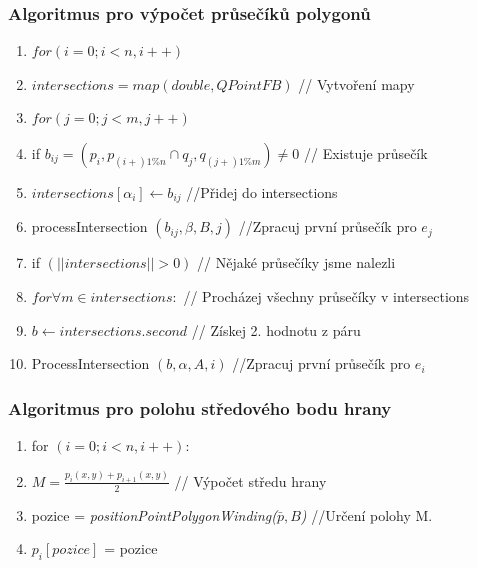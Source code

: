 \documentclass[a4paper, 12pt]{article}
\begin{document}
\newpage
\subsubsection{Algoritmus pro výpočet průsečíků polygonů}
\begin{enumerate}
\item $ for (i = 0; i < n, i++) $ 
\item \hspace {1cm} $ intersections = map (double, QPointFB) $ // Vytvoření mapy 
\item \hspace {1cm} $ for (j = 0; j < m, j++) $
\item \hspace {2cm} if $ b_{ij} = (p_i, p_{(i+)1\%n} \cap q_j, q_{(j+)1\%m }) \neq 0$ // Existuje průsečík
\item \hspace {3cm} $ intersections [\alpha_i] \longleftarrow b_{ij}$ //Přidej do intersections
\item \hspace {3cm} processIntersection $ (b_{ij}, \beta, B, j) $ //Zpracuj první průsečík pro $ e_j $
\item \hspace {1cm} if $(||intersections|| > 0)$ // Nějaké průsečíky jsme nalezli
\item \hspace{2cm} $  for \forall m \in intersections: $ // Procházej všechny průsečíky v intersections
\item  \hspace{3cm} $ b \longleftarrow intersections.second $ // Získej 2. hodnotu z páru
\item \hspace{3cm} ProcessIntersection $ (b, \alpha, A, i) $ //Zpracuj první průsečík pro $ e_i $
\end{enumerate}

\subsubsection{Algoritmus pro polohu středového bodu hrany}
\begin{enumerate}
	\item for $(i = 0; i < n, i++)$:
	\item \hspace{1cm}$ M = \frac{p_i(x,y)+p_{i+1}(x,y)}{2}$ // Výpočet středu hrany
	\item \hspace{1cm}pozice = \textit{ positionPointPolygonWinding($\bar{p},B$)} //Určení polohy M.
	\item \hspace{1cm}$p_i[pozice]$ = pozice
\end{enumerate}
\end{document}
